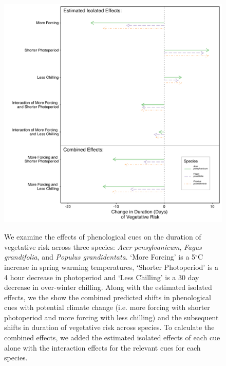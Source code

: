 \documentclass{article}\usepackage[]{graphicx}\usepackage[]{color}
\begin{document}
\begin{figure} [H] 
 \begin{center}
 \includegraphics[width=12cm, height=12cm]{..//figure/Exp_plotTPS.pdf} 
 \caption{We examine the effects of phenological cues on the duration of vegetative risk across three species: \textit{Acer pensylvanicum}, \textit{Fagus grandifolia}, and \textit{Populus grandidentata}. `More Forcing' is a 5$^{\circ}$C increase in spring warming temperatures, `Shorter Photoperiod' is a 4 hour decrease in photoperiod and `Less Chilling' is a 30 day decrease in over-winter chilling. Along with the estimated isolated effects, we the show the combined predicted shifts in phenological cues with potential climate change (i.e. more forcing with shorter photoperiod and more forcing with less chilling) and the subsequent shifts in duration of vegetative risk across species. To calculate the combined effects, we added the estimated isolated effects of each cue alone with the interaction effects for the relevant cues for each species. }\label{fig:dan} 
 \end{center}
 \end{figure}
\end{document}

